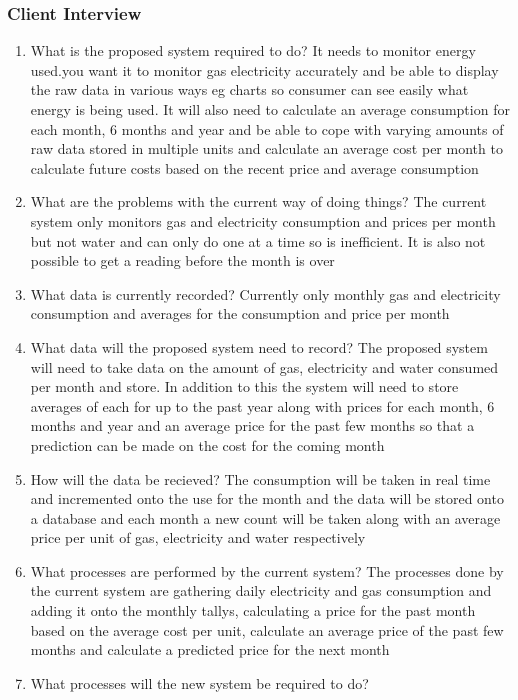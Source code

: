 \subsubsection{Client Interview}
\begin{enumerate}
	\item What is the proposed system required to do?
It needs to monitor energy used.you want it to monitor gas electricity accurately and be able to display the raw data in various ways eg charts so consumer can see easily what energy is being used. It will also need to calculate an average consumption for each month, 6 months and year and be able to cope with varying amounts of raw data stored in multiple units and calculate an average cost per month to calculate future costs based on the recent price and average consumption
	\item What are the problems with the current way of doing things?
The current system only monitors gas and electricity consumption and prices per month but not water and can only do one at a time so is inefficient. It is also not possible to get a reading before the month is over
	\item What data is currently recorded?
Currently only monthly gas and electricity consumption and averages for the consumption and price per month
	\item What data will the proposed system need to record?
The proposed system will need to take data on the amount of gas, electricity and water consumed per month and store. In addition to this the system will need to store averages of each for up to the past year along with prices for each month, 6 months and year and an average price for the past few months so that a prediction can be made on the cost for the coming month
	\item How will the data be recieved?
The consumption will be taken in real time and incremented onto the use for the month and the data will be stored onto a database and each month a new count will be taken along with an average price per unit of gas, electricity and water respectively
	\item What processes are performed by the current system?
The processes done by the current system are gathering daily electricity and gas consumption and adding it onto the monthly tallys, calculating a price for the past month based on the average cost per unit, calculate an average price of the past few months and calculate a predicted price for the next month
	\item What processes will the new system be required to do?

\end{enumerate}
